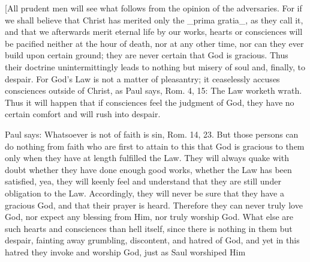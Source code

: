 [All prudent men will see what follows from the opinion of the
adversaries.  For if we shall believe that Christ has merited only
the _prima gratia_, as they call it, and that we afterwards merit
eternal life by our works, hearts or consciences will be pacified
neither at the hour of death, nor at any other time, nor can they
ever build upon certain ground; they are never certain that God is
gracious.  Thus their doctrine unintermittingly leads to nothing but
misery of soul and, finally, to despair.  For God's Law is not a
matter of pleasantry; it ceaselessly accuses consciences outside of
Christ, as Paul says, Rom. 4, 15: The Law worketh wrath.  Thus it
will happen that if consciences feel the judgment of God, they have
no certain comfort and will rush into despair.

Paul says: Whatsoever is not of faith is sin, Rom. 14, 23. But those
persons can do nothing from faith who are first to attain to this
that God is gracious to them only when they have at length fulfilled
the Law.  They will always quake with doubt whether they have done
enough good works, whether the Law has been satisfied, yea, they will
keenly feel and understand that they are still under obligation to
the Law.  Accordingly, they will never be sure that they have a
gracious God, and that their prayer is heard.  Therefore they can
never truly love God, nor expect any blessing from Him, nor truly
worship God.  What else are such hearts and consciences than hell
itself, since there is nothing in them but despair, fainting away
grumbling, discontent, and hatred of God, and yet in this hatred they
invoke and worship God, just as Saul worshiped Him


